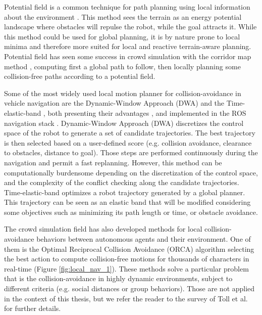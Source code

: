 Potential field \cite{potential_field_1992} is a common technique for path planning using local information about the environment \cite{mpc_potential_field_car_2017}. 
This method sees the terrain as an energy potential landscape where obstacles will repulse the robot, while the goal attracts it.
While this method could be used for global planning, it is by nature prone to local minima and therefore more suited for local and reactive terrain-aware planning.
Potential field has seen some success in crowd simulation with the corridor map method \cite{corridor_geraerts_2007, explicit_corridors_2010}, computing first a global path to follow, then locally planning some collision-free paths according to a potential field.

Some of the most widely used local motion planner for collision-avoidance in vehicle navigation are the Dynamic-Window Approach (DWA) \cite{dynamic_window_fox_1997} and the Time-elastic-band \cite{elastic_band_2013}, both presenting their advantages \cite{dwa_vs_teb_2021_rosmann, dimitri_these_2021}, and implemented in the ROS navigation stack \cite{ROS_software}.
Dynamic-Window Approach (DWA) \cite{dynamic_window_fox_1997} discretizes the control space of the robot to generate a set of candidate trajectories. 
The best trajectory is then selected based on a user-defined score (e.g. collision avoidance, clearance to obstacles, distance to goal). Those steps are performed continuously during the navigation and permit a fast replanning. However, this method can be computationally burdensome depending on the discretization of the control space, and the complexity of the conflict checking along the candidate trajectories.
Time-elastic-band \cite{elastic_band_2013} optimizes a robot trajectory generated by a global planner. This trajectory can be seen as an elastic band that will be modified considering some objectives such as minimizing its path length or time, or obstacle avoidance.

The crowd simulation field has also developed methods for local collision-avoidance behaviors between autonomous agents and their environment. One of them is the Optimal Reciprocal Collision Avoidance (ORCA) algorithm \cite{orca_2011} selecting the best action to compute collision-free motions for thousands of characters in real-time (Figure \ref{fig:local_nav_1}). 
These methods solve a particular problem that is the collision-avoidance in highly dynamic environments, subject to different criteria (e.g. social distances or group behaviors). Those are not applied in the context of this thesis, but we refer the reader to the survey of Toll et al. \cite{vantoll_microscopic_crowd_2021} for further details.\\


